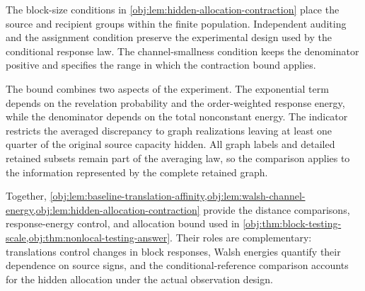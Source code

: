 The block-size conditions in \cref{obj:lem:hidden-allocation-contraction} place the source and recipient groups within the finite population. Independent auditing and the assignment condition preserve the experimental design used by the conditional response law. The channel-smallness condition keeps the denominator positive and specifies the range in which the contraction bound applies.

The bound combines two aspects of the experiment. The exponential term depends on the revelation probability and the order-weighted response energy, while the denominator depends on the total nonconstant energy. The indicator restricts the averaged discrepancy to graph realizations leaving at least one quarter of the original source capacity hidden. All graph labels and detailed retained subsets remain part of the averaging law, so the comparison applies to the information represented by the complete retained graph.

Together, \cref{obj:lem:baseline-translation-affinity,obj:lem:walsh-channel-energy,obj:lem:hidden-allocation-contraction} provide the distance comparisons, response-energy control, and allocation bound used in \cref{obj:thm:block-testing-scale,obj:thm:nonlocal-testing-answer}. Their roles are complementary: translations control changes in block responses, Walsh energies quantify their dependence on source signs, and the conditional-reference comparison accounts for the hidden allocation under the actual observation design.
